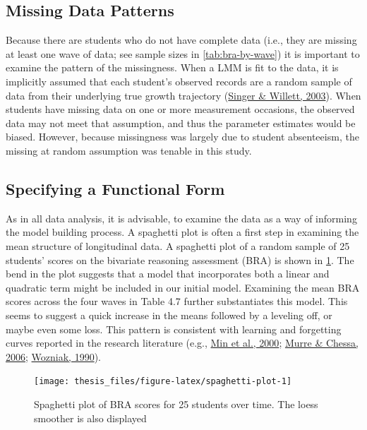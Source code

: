 \documentclass[11pt]{umnthesis}
\begin{document}
\hypertarget{missing-data-patterns}{%
\subsection{Missing Data Patterns}\label{missing-data-patterns}}

Because there are students who do not have complete data (i.e., they are missing at least one wave of data; see sample sizes in \ref{tab:bra-by-wave}) it is important to examine the pattern of the missingness. When a LMM is fit to the data, it is implicitly assumed that each student's observed records are a random sample of data from their underlying true growth trajectory (\protect\hyperlink{ref-singer:2003}{Singer \& Willett, 2003}). When students have missing data on one or more measurement occasions, the observed data may not meet that assumption, and thus the parameter estimates would be biased. However, because missingness was largely due to student absenteeism, the missing at random assumption was tenable in this study.

\hypertarget{specifying-a-functional-form}{%
\subsection{Specifying a Functional Form}\label{specifying-a-functional-form}}

As in all data analysis, it is advisable, to examine the data as a way of informing the model building process. A spaghetti plot is often a first step in examining the mean structure of longitudinal data. A spaghetti plot of a random sample of 25 students' scores on the bivariate reasoning assessment (BRA) is shown in \ref{fig:spaghetti-plot}. The bend in the plot suggests that a model that incorporates both a linear and quadratic term might be included in our initial model. Examining the mean BRA scores across the four waves in Table 4.7 further substantiates this model. This seems to suggest a quick increase in the means followed by a leveling off, or maybe even some loss. This pattern is consistent with learning and forgetting curves reported in the research literature (e.g., \protect\hyperlink{ref-min:2000}{Min et al., 2000}; \protect\hyperlink{ref-murre:2006}{Murre \& Chessa, 2006}; \protect\hyperlink{ref-wozniak:1990}{Wozniak, 1990}).

\begin{figure}[H]

{\centering \texttt{[image: thesis\_files/figure-latex/spaghetti-plot-1]} 

}

\caption[Spaghetti plot of BRA scores for 25 students over time]{Spaghetti plot of BRA scores for 25 students over time. The loess smoother is also displayed}\label{fig:spaghetti-plot}
\end{figure}
\end{document}
